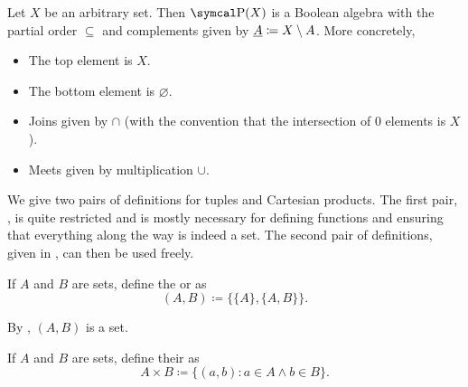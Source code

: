 \begin{proposition}\label{thm:subsets_form_boolean_algebra}
  Let \( X \) be an arbitrary set. Then \( \Power(X) \) is a Boolean algebra with the partial order \( \subseteq \) and complements given by \( \underline{A} \coloneqq X \setminus A \). More concretely,
  \begin{itemize}
    \item The top element is \( X \).
    \item The bottom element is \( \varnothing \).
    \item Joins given by \( \cap \) (with the convention that the intersection of \( 0 \) elements is \( X \)).
    \item Meets given by multiplication \( \cup \).
  \end{itemize}
\end{proposition}

\begin{remark}\label{remark:binary_vs_arbitrary_tuples}
  We give two pairs of definitions for tuples and Cartesian products. The first pair, , is quite restricted and is mostly necessary for defining functions and ensuring that everything along the way is indeed a set. The second pair of definitions, given in , can then be used freely.
\end{remark}

\begin{definition}\label{def:kuratowski_pair}\cite[36]{Enderton1977}
  If \( A \) and \( B \) are sets, define the  or  as
  \begin{equation*}
    (A, B) \coloneqq \{ \{ A \}, \{ A, B \} \}.
  \end{equation*}

  By , \( (A, B) \) is a set.
\end{definition}

\begin{definition}\label{def:binary_cartesian_product}\cite[37]{Enderton1977}
  If \( A \) and \( B \) are sets, define their  as
  \begin{equation*}
    A \times B \coloneqq \{ (a, b) \colon a \in A \land b \in B \}.
  \end{equation*}
\end{definition}

